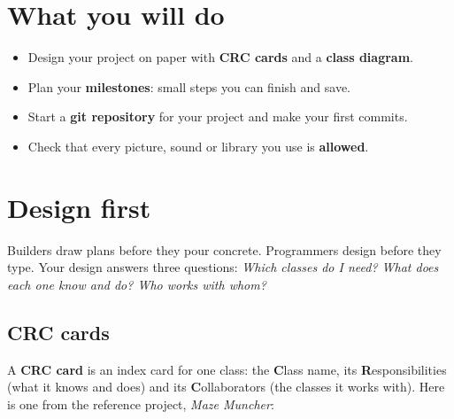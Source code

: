 
\section{What you will do}
\begin{itemize}[itemsep=1pt]
  \item Design your project on paper with \textbf{CRC cards} and a \textbf{class diagram}.
  \item Plan your \textbf{milestones}: small steps you can finish and save.
  \item Start a \textbf{git repository} for your project and make your first commits.
  \item Check that every picture, sound or library you use is \textbf{allowed}.
\end{itemize}

\section{Design first}
Builders draw plans before they pour concrete. Programmers design before they type. Your design answers three questions: \emph{Which classes do I need? What does each one know and do? Who works with whom?}

\subsection{CRC cards}
A \textbf{CRC card} is an index card for one class: the \textbf{C}lass name, its \textbf{R}esponsibilities (what it knows and does) and its \textbf{C}ollaborators (the classes it works with). Here is one from the reference project, \emph{Maze Muncher}:

\begin{center}
\end{center}

